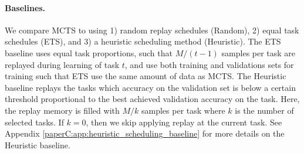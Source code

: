 \vspace{-3mm}
\paragraph{Baselines.} We compare MCTS to using 1) random replay schedules (Random), 2) equal task schedules (ETS), and 3) a heuristic scheduling method (Heuristic). The ETS baseline uses equal task proportions, such that $M/(t-1)$ samples per task are replayed during learning of task $t$, and use both training and validations sets for training such that ETS use the same amount of data as MCTS. %
The Heuristic baseline replays the tasks which accuracy on the validation set is below a certain threshold proportional to the best achieved validation accuracy on the task. Here, the replay memory is filled with $M/k$ samples per task where $k$ is the number of selected tasks. If $k=0$, then we skip applying replay at the current task.  
See Appendix \ref{paperC:app:heuristic_scheduling_baseline} for more details on the Heuristic baseline. 


\begin{table}[t]
	\footnotesize
	\centering
	\caption{
		Performance comparison with ACC between MCTS (Ours), Random scheduling (Random), Equal Task Schedule (ETS), and Heuristic Scheduling (Heuristic) with various memory selection methods evaluated across all datasets. We provide the metrics for training on all seen task datasets jointly (Joint) as an upper bound, as well as include the results from a breadth-first search (BFS) with Uniform memory selection for the 5-task datasets. 
		Replay memory sizes are $M=10$ and $M=100$ for the 5-task and 10/20-task datasets respectively. We report the mean and standard deviation averaged over 5 seeds. Ours performs better or on par with the baselines on most datasets and selection methods, where MoF yields the best results %
		in general.
	}
	\vspace{-3mm}
	\resizebox{0.98\textwidth}{!}{ %
	
	}
\vspace{-3mm}
\label{tab:results_memory_selection_methods}
\end{table}


